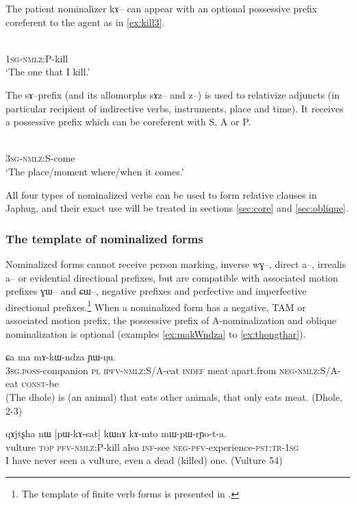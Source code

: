 \documentclass[oldfontcommands,oneside,a4paper,11pt]{article}
\newcommand{\ipa}[1]{{\phon #1}} %
\begin{document}
  The patient nominalizer \ipa{kɤ--} can appear with an optional possessive prefix coreferent to the agent as in \ref{ex:kill3}.
  \begin{exe}
\ex \label{ex:kill3}
\gll \ipa{a-kɤ-sat}    \\
   \textsc{1sg-nmlz}:P-kill \\
 \glt  `The one that I kill.'
 \end{exe}

The \ipa{sɤ}--prefix (and its allomorphs \ipa{sɤz}-- and \ipa{z}--) is used to relativize adjuncts (in particular recipient of indirective verbs, instruments, place and time).  It receives a possessive prefix  which can be coreferent with S, A or P.

   \begin{exe}
\ex \label{ex:come}
\gll \ipa{ɯ-sɤ-ɣi}    \\
   \textsc{3sg-nmlz}:S-come \\
 \glt  `The place/moment where/when it comes.'
 \end{exe}
 
 All four types of nominalized verbs can be used to form relative clauses in Japhug, and their exact use will be treated in sections \ref{sec:core} and \ref{sec:oblique}.
 
 \subsubsection{The template of nominalized forms}
Nominalized forms cannot receive person marking, inverse \ipa{wɣ}--, direct \ipa{a}--, irrealis \ipa{a}-- or evidential directional prefixes, but are compatible with associated motion prefixes \ipa{ɣɯ}-- and \ipa{ɕɯ}--, negative prefixes and perfective and imperfective directional prefixes.\footnote{The template of finite verb forms is presented in \citet{jacques13harmonization}.} When a nominalized form has a negative, TAM or associated motion prefix, the possessive prefix of A-nominalization and oblique nominalization is optional (examples \ref{ex:makWndza} to \ref{ex:thongthar}).
 


    \begin{exe}
\ex \label{ex:makWndza}
\gll
[\ipa{ɯ-zda}  	\ipa{ra}  	\ipa{chɯ-kɯ-ndza}]  	\ipa{ci,}  	\ipa{ɕa}  	\ipa{ma}  	\ipa{mɤ-kɯ-ndza}  	\ipa{ɲɯ-ŋu.}  	 \\
\textsc{3sg.poss}-companion  \textsc{pl} \textsc{ipfv-nmlz}:S/A-eat \textsc{indef} meat apart.from \textsc{neg-nmlz}:S/A-eat \textsc{const}-be \\
\glt (The dhole) is (an animal) that eats other animals, that only eats meat. (Dhole, 2-3)
 \end{exe}
     \begin{exe}
\ex \label{ex:kill4}
\gll
\ipa{qɤjtʂha}  	\ipa{nɯ}  	[\ipa{pɯ-kɤ-sat}]  	\ipa{kɯnɤ}  	\ipa{kɤ-mto}  	\ipa{mɯ-pɯ-rɲo-t-a.}  \\
vulture \textsc{top} \textsc{pfv-nmlz:P}-kill  also \textsc{inf}-see \textsc{neg-pfv}-experience-\textsc{pst:tr-1sg} \\
\glt I have never seen a vulture, even a dead (killed) one. (Vulture 54)
 \end{exe}
  
\end{document}
